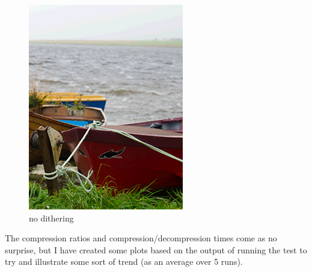 \documentclass[]{article}
\begin{document}
\begin{figure}[!htbp]
\begin{minipage}[b]{0.4\textwidth}
		\includegraphics[width=\textwidth]{img/dithering_none}
		\caption{no dithering}
	\end{minipage}
\end{figure}
The compression ratios and compression/decompression times come as no surprise, but I have created some plots based on the output of running the test to try and illustrate some sort of trend (as an average over 5 runs).
\end{document}
